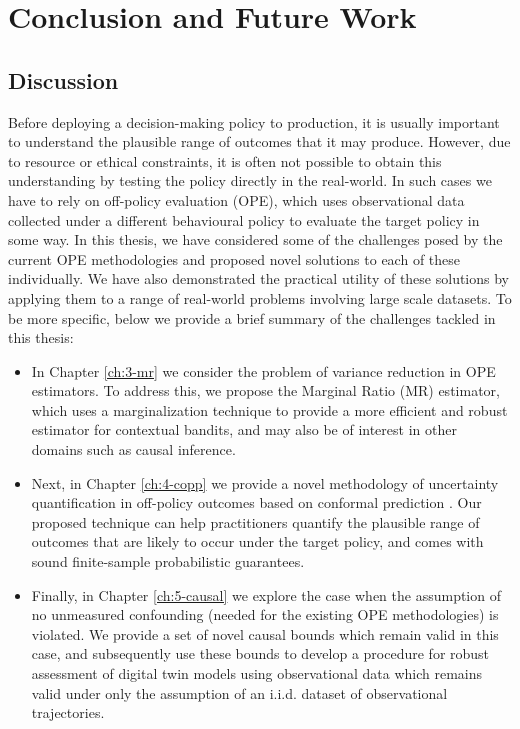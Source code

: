 \chapter{\label{ch:6-conclusion}Conclusion and Future Work} 

\minitoc

\section{Discussion}
%

Before deploying a decision-making policy to production, it is usually important to understand the
plausible range of outcomes that it may produce. However, due to resource or ethical constraints, it is
often not possible to obtain this understanding by testing the policy directly in the real-world. In such
cases we have to rely on off-policy evaluation (OPE), which uses observational data collected under a different behavioural policy to evaluate the target policy in some way. 
In this thesis, we have considered some of the challenges posed by the current OPE methodologies and proposed novel solutions to each of these individually.
We have also demonstrated the practical utility of these solutions by applying them to a range of real-world problems involving large scale datasets.
To be more specific, below we provide a brief summary of the challenges tackled in this thesis:
\begin{itemize}
    \item In Chapter \ref*{ch:3-mr} we consider the problem of variance reduction in OPE estimators. To address this, we propose the Marginal Ratio (MR) estimator, which uses a marginalization technique to provide a more efficient and robust estimator for contextual bandits, and may also be of interest in other domains such as causal inference. 
    \item Next, in Chapter \ref*{ch:4-copp} we provide a novel methodology of uncertainty quantification in off-policy outcomes based on conformal prediction \citep{vovk2005algorithmic}. Our proposed technique can help practitioners quantify the plausible range of outcomes that are likely to occur under the target policy, and comes with sound finite-sample probabilistic guarantees.
    \item Finally, in Chapter \ref*{ch:5-causal} we explore the case when the assumption of no unmeasured confounding (needed for the existing OPE methodologies) is violated. 
    We provide a set of novel causal bounds which remain valid in this case, and subsequently use these bounds to develop a procedure for robust assessment of digital twin models using observational data which remains valid under only the assumption of an i.i.d. dataset of observational trajectories. 
\end{itemize}
%
%

